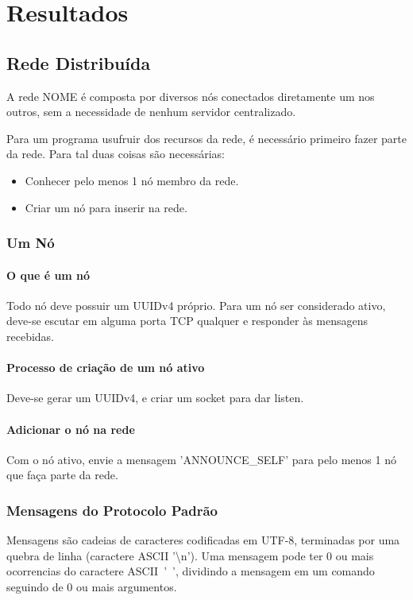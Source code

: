 \chapter{Resultados}
\label{sec:resultados}

\section{Rede Distribuída}
\label{sec:resultados:rede}

  A rede NOME é composta por diversos nós conectados diretamente um nos outros, sem a necessidade
  de nenhum servidor centralizado.
  
  Para um programa usufruir dos recursos da rede, é necessário primeiro fazer parte da rede. Para 
  tal duas coisas são necessárias:
  
  \begin{itemize}
    \item Conhecer pelo menos 1 nó membro da rede.
    \item Criar um nó para inserir na rede.
  \end{itemize}
  
  \subsection{Um Nó}
    \subsubsection{O que é um nó}
      Todo nó deve possuir um UUIDv4 próprio.
      Para um nó ser considerado ativo, deve-se escutar em alguma porta TCP qualquer e responder às
      mensagens recebidas.
      
    \subsubsection{Processo de criação de um nó ativo}
      Deve-se gerar um UUIDv4, e criar um socket para dar listen.

    \subsubsection{Adicionar o nó na rede}
      Com o nó ativo, envie a mensagem 'ANNOUNCE\_SELF' para pelo menos 1 nó que faça parte da rede.

  \subsection{Mensagens do Protocolo Padrão}
    Mensagens são cadeias de caracteres codificadas em UTF-8, terminadas por uma quebra de linha
    (caractere ASCII '\textbackslash n'). Uma mensagem pode ter 0 ou mais ocorrencias do caractere
    ASCII~'~', dividindo a mensagem em um comando seguindo de 0 ou mais argumentos.
    

